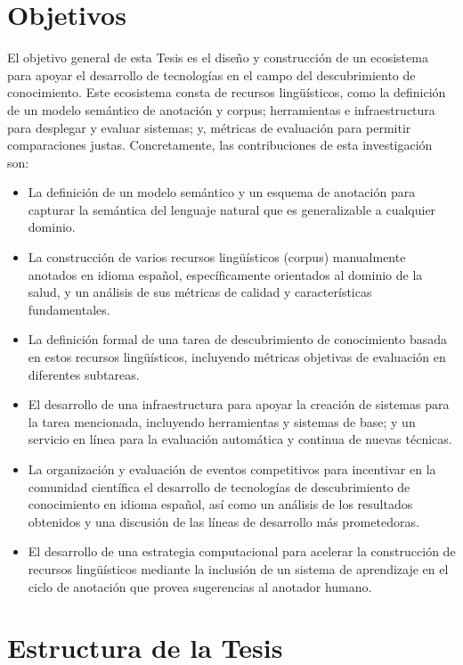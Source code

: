 \section{Objetivos}
\label{chap1:objectives}

El objetivo general de esta Tesis es el diseño y construcción de un ecosistema para apoyar el desarrollo de tecnologías
en el campo del descubrimiento de conocimiento. Este ecosistema consta de recursos lingüísticos, como la definición de un modelo semántico de anotación y corpus; herramientas e infraestructura para desplegar y evaluar sistemas; y, métricas de evaluación para permitir comparaciones justas. Concretamente, las contribuciones de esta investigación son:
\begin{itemize}
    \item La definición de un modelo semántico y un esquema de anotación para capturar la semántica del lenguaje natural que es generalizable a cualquier dominio.
    \item La construcción de varios recursos lingüísticos (corpus) manualmente anotados en idioma español, específicamente orientados al dominio de la salud, y un análisis de sus métricas de calidad y características fundamentales.
    \item La definición formal de una tarea de descubrimiento de conocimiento basada en estos recursos lingüísticos, incluyendo métricas objetivas de evaluación en diferentes subtareas.
    \item El desarrollo de una infraestructura para apoyar la creación de sistemas para la tarea mencionada, incluyendo herramientas y sistemas de base; y un servicio en línea para la evaluación automática y continua de nuevas técnicas.
    \item La organización y evaluación de eventos competitivos para incentivar en la comunidad científica el desarrollo de tecnologías de descubrimiento de conocimiento en idioma español, así como un análisis de los resultados obtenidos y una discusión de las líneas de desarrollo más prometedoras.
    \item El desarrollo de una estrategia computacional para acelerar la construcción de recursos lingüísticos mediante la inclusión de un sistema de aprendizaje en el ciclo de anotación que provea sugerencias al anotador humano.
\end{itemize}

\section{Estructura de la Tesis}
\label{chap1:thesis-structure}

